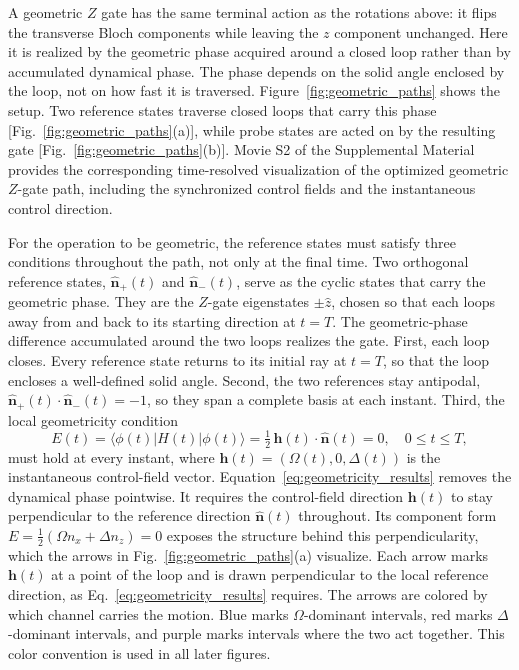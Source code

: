 \documentclass[aps,prx,reprint,superscriptaddress,nofootinbib,longbibliography,floatfix,showkeys]{revtex4-2}
\begin{document}
A geometric $Z$ gate has the same terminal action as the rotations above:
it flips the transverse Bloch components while leaving the $z$ component
unchanged.  Here it is realized by the geometric phase acquired around a
closed loop rather than by accumulated dynamical phase.  The phase depends
on the solid angle enclosed by the loop, not on how fast it is traversed.
Figure~\ref{fig:geometric_paths} shows the setup.  Two reference states
traverse closed loops that carry this phase
[Fig.~\ref{fig:geometric_paths}(a)], while probe states are acted on by the
resulting gate [Fig.~\ref{fig:geometric_paths}(b)].  Movie S2 of the
Supplemental Material~\cite{supplemental} provides the corresponding
time-resolved visualization of the optimized geometric $Z$-gate path,
including the synchronized control fields and the instantaneous control
direction.

For the operation to be geometric, the reference states must satisfy three
conditions throughout the path, not only at the final time.  Two orthogonal
reference states, $\hat{\bm n}_+(t)$ and $\hat{\bm n}_-(t)$, serve as the
cyclic states that carry the geometric phase.  They are the $Z$-gate
eigenstates $\pm\hat z$, chosen so that each loops away from and back to
its starting direction at $t=T$.  The geometric-phase difference accumulated
around the two loops realizes the gate.  First, each loop closes.  Every
reference state returns to its initial ray at $t=T$, so that the loop
encloses a well-defined solid angle.  Second, the two references stay
antipodal, $\hat{\bm n}_+(t)\cdot\hat{\bm n}_-(t)=-1$, so they span a
complete basis at each instant.  Third, the local geometricity condition
\begin{equation}
    E(t)=\langle\phi(t)|H(t)|\phi(t)\rangle=\tfrac12\,\bm h(t)\cdot\hat{\bm n}(t)=0,
    \quad 0\le t\le T,
    \label{eq:geometricity_results}
\end{equation}
must hold at every instant, where $\bm h(t)=(\Omega(t),0,\Delta(t))$ is the
instantaneous control-field vector.  Equation~\eqref{eq:geometricity_results}
removes the dynamical phase pointwise.  It requires the control-field
direction $\bm h(t)$ to stay perpendicular to the reference direction
$\hat{\bm n}(t)$ throughout.  Its component form
$E=\tfrac12(\Omega n_x+\Delta n_z)=0$ exposes the structure behind this
perpendicularity, which the arrows in Fig.~\ref{fig:geometric_paths}(a)
visualize.  Each arrow marks $\bm h(t)$ at a point of the loop and is drawn
perpendicular to the local reference direction, as
Eq.~\eqref{eq:geometricity_results} requires.  The arrows are colored by
which channel carries the motion.  Blue marks $\Omega$-dominant intervals,
red marks $\Delta$-dominant intervals, and purple marks intervals where the
two act together.  This color convention is used in all later figures.
\end{document}
